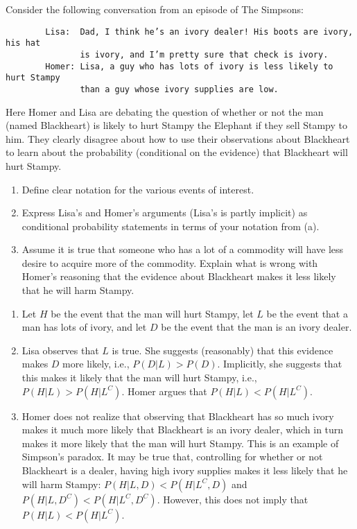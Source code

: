 

\setcounter{theorem}{21}
\begin{exercise}[BH.2.56]
  Consider the following conversation from an episode of The Simpsons:

    \begin{verbatim}
        Lisa:  Dad, I think he’s an ivory dealer! His boots are ivory, his hat
               is ivory, and I’m pretty sure that check is ivory.
        Homer: Lisa, a guy who has lots of ivory is less likely to hurt Stampy
               than a guy whose ivory supplies are low.
    \end{verbatim}

    Here Homer and Lisa are debating the question of whether or not the man (named Blackheart) is likely to hurt Stampy the Elephant if they sell Stampy to him. They clearly disagree about how to use their observations about Blackheart to learn about the probability (conditional on the evidence) that Blackheart will hurt Stampy.
    \begin{enumerate}
        \item Define clear notation for the various events of interest.
        \item Express Lisa's and Homer's arguments (Lisa's is partly implicit) as conditional probability statements in terms of your notation from (a).
        \item Assume it is true that someone who has a lot of a commodity will have less desire to acquire more of the commodity. Explain what is wrong with Homer's reasoning that the evidence about Blackheart makes it less likely that he will harm Stampy.
    \end{enumerate}
\begin{solution}
    \begin{enumerate}
        \item Let $H$ be the event that the man will hurt Stampy, let $L$ be the event that a man has lots of ivory, and let $D$ be the event that the man is an ivory dealer.
        \item Lisa observes that $L$ is true. She suggests (reasonably) that this evidence makes $D$ more likely, i.e., $P(D|L) > P(D)$. Implicitly, she suggests that this makes it likely that the man will hurt Stampy, i.e., $P(H|L) > P(H|L^C)$. Homer argues that $P(H|L) < P(H|L^C)$.
        \item Homer does not realize that observing that Blackheart has so much ivory makes it much more likely that Blackheart is an ivory dealer, which in turn makes it more likely that the man will hurt Stampy. This is an example of Simpson’s paradox. It may be true that, controlling for whether or not Blackheart is a dealer, having high ivory supplies makes it less likely that he will harm Stampy: $P(H|L, D) < P(H|L^C,D)$ and $P(H|L, D^C) < P(H|L^C,D^C)$. However, this does not imply that $P(H|L) < P(H|L^{C})$.
    \end{enumerate}
\end{solution}
\end{exercise}

